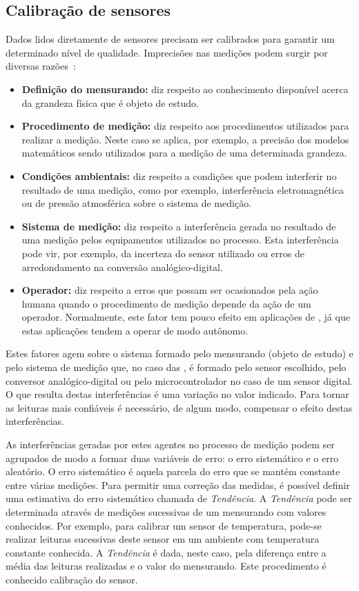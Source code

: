\subsection{Calibração de sensores}

Dados lidos diretamente de sensores precisam ser calibrados para garantir um
determinado nível de qualidade. Imprecisões nas medições podem surgir por
diversas razões~\cite{Albertazzi:2008}:
\begin{itemize}
    \item \textbf{Definição do mensurando:} diz respeito ao conhecimento
    disponível acerca da grandeza física que é objeto de estudo.
    \item \textbf{Procedimento de medição:}  diz respeito aos procedimentos
    utilizados para realizar a medição. Neste caso se aplica, por exemplo, a
    precisão dos modelos matemáticos sendo utilizados para a medição de uma
    determinada grandeza.
    \item \textbf{Condições ambientais:} diz respeito a condições que podem
    interferir no resultado de uma medição, como por exemplo, interferência
    eletromagnética ou de pressão atmosférica sobre o sistema de medição.
    \item \textbf{Sistema de medição:} diz respeito a interferência gerada no
    resultado de uma medição pelos equipamentos utilizados no processo. Esta
    interferência pode vir, por exemplo, da incerteza do sensor utilizado ou
    erros de arredondamento na conversão analógico-digital.
    \item \textbf{Operador:} diz respeito a erros que possam ser ocasionados
    pela ação humana quando o procedimento de medição depende da ação de um
    operador. Normalmente, este fator tem pouco efeito em aplicações de \rssf,
    já que estas aplicações tendem a operar de modo autônomo.
\end{itemize}

Estes fatores agem sobre o sistema formado pelo mensurando (objeto de estudo) e
pelo sistema de medição que, no caso das \rssf, é formado pelo sensor escolhido,
pelo conversor analógico-digital ou pelo microcontrolador no caso de um sensor
digital. O que resulta destas interferências é uma variação no valor indicado.
Para tornar as leituras mais confiáveis é necessário, de algum modo, compensar o
efeito destas interferências.

As interferências geradas por estes agentes no processo de medição podem ser
agrupados de modo a formar duas variáveis de erro: o erro sistemático e o erro
aleatório. O erro sistemático é aquela parcela do erro que se mantém constante
entre várias medições. Para permitir uma correção das medidas, é possível
definir uma estimativa do erro sistemático chamada de \emph{Tendência}. A
\emph{Tendência} pode ser determinada através de medições sucessivas de um
mensurando com valores conhecidos. Por exemplo, para calibrar um sensor de
temperatura, pode-se realizar leituras sucessivas deste sensor em um ambiente
com temperatura constante conhecida. A \emph{Tendência} é dada, neste caso, pela
diferença entre a média das leituras realizadas e o valor do mensurando. Este
procedimento é conhecido calibração do sensor.

